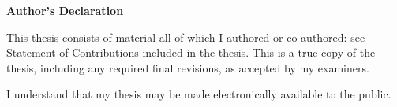 \begin{center}\textbf{Author's Declaration}\end{center}

\noindent
This thesis consists of material all of which I authored or co-authored: see Statement of Contributions included in the thesis. This is a true copy of the thesis, including any required final revisions, as accepted by my examiners.

\bigskip

\noindent
I understand that my thesis may be made electronically available to the public.

\clearpage